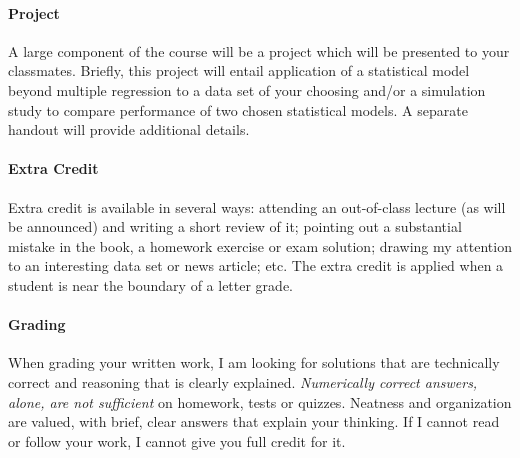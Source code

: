 \documentclass[11pt]{article}
\begin{document}
\paragraph{Project}
A large component of the course will be a project which will be presented to your classmates.
Briefly, this project will entail application of a statistical model beyond multiple regression to a data set of your choosing and/or a simulation study to compare performance of two chosen statistical models.
A separate handout will provide additional details.

\paragraph{Extra Credit}
Extra credit is available in several ways: attending an out-of-class lecture (as will be announced) and writing a short review of it; pointing out a substantial mistake in the book, a homework exercise or exam solution; drawing my attention to an interesting data set or news article; etc. The extra credit is applied when a student is near the boundary of a letter grade.

\paragraph{Grading}
When grading your written work, I am looking for solutions that are technically correct and reasoning that is clearly explained.  \emph{Numerically correct answers, alone, are not sufficient} on homework, tests or quizzes.  Neatness and organization are valued, with brief, clear answers that explain your thinking.  If I cannot read or follow your work, I cannot give you full credit for it.
\end{document}
